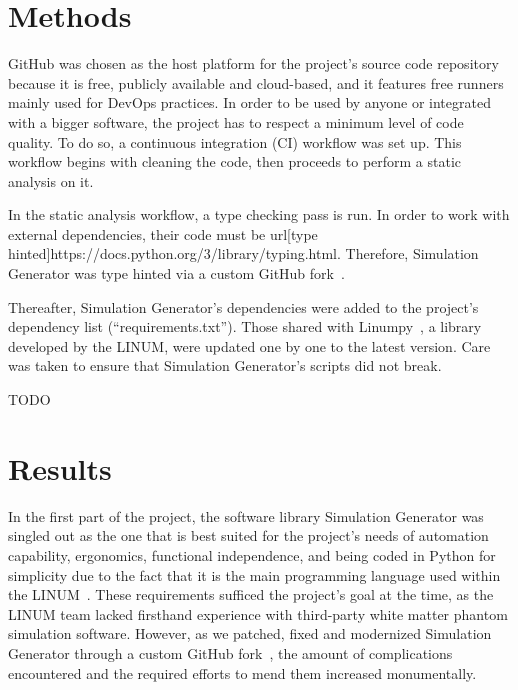 \documentclass{article}
\begin{document}
  \section{Methods}\label{sec:methodology}

  GitHub was chosen as the host platform for the project's source code repository because it is free, publicly available and cloud-based, and it features free runners mainly used for DevOps practices.
  In order to be used by anyone or integrated with a bigger software, the project has to respect a minimum level of code quality.
  To do so, a continuous integration (CI) workflow was set up.
  This workflow begins with cleaning the code, then proceeds to perform a static analysis on it.

  In the static analysis workflow, a type checking pass is run.
  In order to work with external dependencies, their code must be url[type hinted]{https://docs.python.org/3/library/typing.html}.
  Therefore, Simulation Generator was type hinted via a custom GitHub fork~\cite{dubreuil2022inm5803fiberconfiggen, valcourtcaron2022simulationgenerator}.

  Thereafter, Simulation Generator's dependencies were added to the project's dependency list (``requirements.txt'').
  Those shared with Linumpy~\cite{linum2022linumpy}, a library developed by the LINUM, were updated one by one to the latest version.
  Care was taken to ensure that Simulation Generator's scripts did not break.

  TODO


  \section{Results}\label{sec:results}

  In the first part of the project, the software library Simulation Generator was singled out as the one that is best suited for the project's needs of automation capability, ergonomics, functional independence, and being coded in Python for simplicity due to the fact that it is the main programming language used within the LINUM~\cite{dubreuil2022inf6200}.
  These requirements sufficed the project's goal at the time, as the LINUM team lacked firsthand experience with third-party white matter phantom simulation software.
  However, as we patched, fixed and modernized Simulation Generator through a custom GitHub fork~\cite{dubreuil2022inm5803fiberconfiggen, valcourtcaron2022simulationgenerator}, the amount of complications encountered and the required efforts to mend them increased monumentally.
\end{document}
